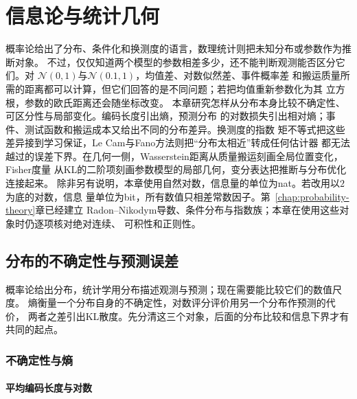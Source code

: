 \chapter{信息论与统计几何}
\label{chap:information-theory-and-statistical-geometry}
概率论给出了分布、条件化和换测度的语言，数理统计则把未知分布或参数作为推断对象。
不过，仅仅知道两个模型的参数相差多少，还不能判断观测能否区分它们。对
\(\mathcal{N}(0,1)\)与\(\mathcal{N}(0.1,1)\)，均值差、对数似然差、事件概率差
和搬运质量所需的距离都可以计算，但它们回答的是不同问题；若把均值重新参数化为其
立方根，参数的欧氏距离还会随坐标改变。
本章研究怎样从分布本身比较不确定性、可区分性与局部变化。编码长度引出熵，预测分布
的对数损失引出相对熵；事件、测试函数和搬运成本又给出不同的分布差异。换测度的指数
矩不等式把这些差异接到学习保证，Le Cam与Fano方法则把“分布太相近”转成任何估计器
都无法越过的误差下界。在几何一侧，Wasserstein距离从质量搬运刻画全局位置变化，Fisher度量
从KL的二阶项刻画参数模型的局部几何，变分表达把推断与分布优化连接起来。
除非另有说明，本章使用自然对数，信息量的单位为nat。若改用以\(2\)为底的对数，信息
量单位为bit，所有数值只相差常数因子。第~\ref{chap:probability-theory}章已经建立
Radon--Nikodym导数、条件分布与指数族；本章在使用这些对象时仍逐项核对绝对连续、
可积性和正则性。
\section{分布的不确定性与预测误差}
\label{sec:information-uncertainty-prediction}

概率论给出分布，统计学用分布描述观测与预测；现在需要能比较它们的数值尺度。
熵衡量一个分布自身的不确定性，对数评分评价用另一个分布作预测的代价，
两者之差引出KL散度。先分清这三个对象，后面的分布比较和信息下界才有共同的起点。

\subsection{不确定性与熵}
\label{sec:information-entropy}
\subsubsection{平均编码长度与对数}

